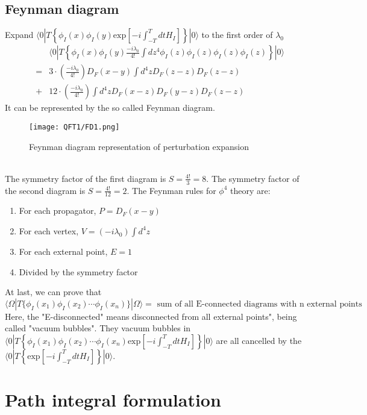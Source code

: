 \documentclass[cyan]{elegantnote}
\begin{document}
\subsection{Feynman diagram}
Expand $\langle 0 | T \left\{ \phi_I(x) \phi_I(y) \mathrm{exp} \left[ -i \int_{-T}^{T} dt H_I \right]\right\} | 0 \rangle$ to the first order of $\lambda_0$
\begin{eqnarray}
& &\langle 0 | T \left\{ \phi_I(x) \phi_I(y) \frac{-i\lambda_0}{4!} \int dz^4 \phi_I(z) \phi_I(z) \phi_I(z) \phi_I(z) \right\} | 0 \rangle \nonumber \\
&=& 3 \cdot (\frac{-i\lambda_0}{4!}) D_F(x-y) \int d^4 z D_F(z-z) D_F(z-z) \nonumber \\
&+& 12 \cdot (\frac{-i\lambda_0}{4!}) \int d^4 z  D_F(x-z) D_F(y-z) D_F(z-z) \nonumber
\end{eqnarray}
It can be represented by the so called Feynman diagram.
\begin{figure}[!h]
\centering
\texttt{[image: QFT1/FD1.png]}
\caption{Feynman diagram representation of perturbation expansion}
\end{figure}
\\
The symmetry factor of the first diagram is $S = \frac{4!}{3} = 8$.
The symmetry factor of the second diagram is $S = \frac{4!}{12} = 2$.
The Feynman rules for $\phi^4$ theory are:
\begin{enumerate}
\item For each propagator, $P = D_F(x-y)$
\item For each vertex, $V = (-i\lambda_0)\int d^4z$
\item For each external point, $E=1$
\item Divided by the symmetry factor
\end{enumerate}
At last, we can prove that
\[\langle \Omega | T \{ \phi_I(x_1) \phi_I(x_2) \cdots \phi_I(x_n) \} | \Omega \rangle = \mbox{ sum of all E-connected diagrams with n external points}\]
Here, the "E-disconnected" means disconnected from all external points", being called "vacuum bubbles". They vacuum bubbles in $\langle 0 | T \left\{ \phi_I(x_1) \phi_I(x_2) \cdots \phi_I(x_n) \mathrm{exp} \left[ -i \int_{-T}^{T} dt H_I \right]\right\} | 0 \rangle$ are all cancelled by the $\langle 0 | T \left\{ \mathrm{exp} \left[ -i \int_{-T}^{T} dt H_I \right]\right\} | 0 \rangle$.

\section{Path integral formulation}
\end{document}
